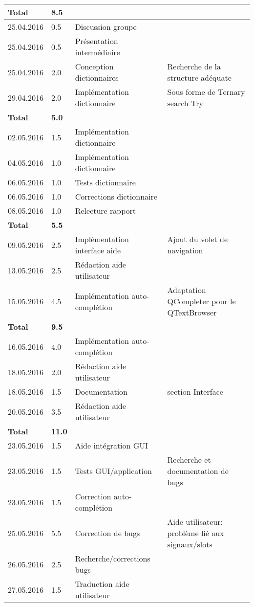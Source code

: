 \documentclass[french]{article}
\begin{document}
\begin{longtable}{p{}|p{}|p{}|p{}}
		\textbf{Total} & \textbf{8.5} &&\\
		\hline
		25.04.2016 & 0.5 & Discussion groupe & \\
		25.04.2016 & 0.5 & Présentation intermédiaire & \\
		25.04.2016 & 2.0 & Conception dictionnaires & Recherche de la structure adéquate\\
		29.04.2016 & 2.0 & Implémentation dictionnaire & Sous forme de Ternary search Try\\
		\textbf{Total} & \textbf{5.0} &&\\
		\hline
		02.05.2016 & 1.5 & Implémentation dictionnaire & \\
		04.05.2016 & 1.0 & Implémentation dictionnaire & \\
		06.05.2016 & 1.0 & Tests dictionnaire & \\
		06.05.2016 & 1.0 & Corrections dictionnaire & \\
		08.05.2016 & 1.0 & Relecture rapport & \\
		\textbf{Total} & \textbf{5.5} &&\\
		\hline
		09.05.2016 & 2.5 & Implémentation interface aide & Ajout du volet de navigation \\
		13.05.2016 & 2.5 & Rédaction aide utilisateur & \\
		15.05.2016 & 4.5 & Implémentation auto-complétion & Adaptation QCompleter pour le QTextBrowser\\
		\textbf{Total} & \textbf{9.5} &&\\
		\hline
		16.05.2016 & 4.0 & Implémentation auto-complétion & \\
		18.05.2016 & 2.0 & Rédaction aide utilisateur & \\
		18.05.2016 & 1.5 & Documentation & section Interface\\
		20.05.2016 & 3.5 & Rédaction aide utilisateur & \\
		\textbf{Total} & \textbf{11.0} &&\\
		\hline
		23.05.2016 & 1.5 & Aide intégration GUI & \\
		23.05.2016 & 1.5 & Tests GUI/application & Recherche et documentation de bugs\\
		23.05.2016 & 1.5 & Correction auto-complétion & \\
		25.05.2016 & 5.5 & Correction de bugs & Aide utilisateur: problème lié aux signaux/slots\\
		26.05.2016 & 2.5 & Recherche/corrections bugs & \\
		27.05.2016 & 1.5 & Traduction aide utilisateur & \\

\end{longtable}
\end{document}
